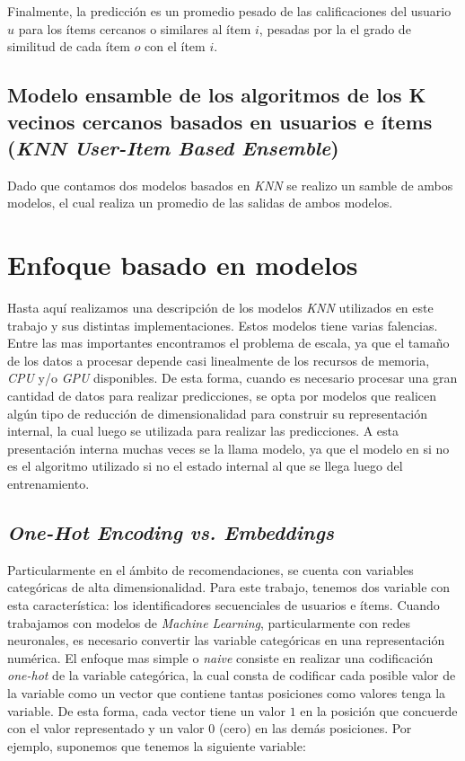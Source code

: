 \documentclass[11pt,a4paper,twoside]{thesis}
\begin{document}
Finalmente, la predicción es un promedio pesado de las calificaciones del
usuario $u$ para los ítems cercanos o similares al ítem $i$, pesadas por la el
grado de similitud de cada ítem $o$ con el ítem $i$.

\subsection{Modelo ensamble de los algoritmos de los K vecinos cercanos basados
	en usuarios e ítems (\textit{KNN User-Item Based Ensemble})}

Dado que contamos dos modelos basados en \textit{KNN} se realizo un samble de
ambos modelos, el cual realiza un promedio de las salidas de ambos modelos.

\section{Enfoque basado en modelos}

Hasta aquí realizamos una descripción de los modelos \textit{KNN} utilizados en
este trabajo y sus distintas implementaciones. Estos modelos tiene varias
falencias. Entre las mas importantes encontramos el problema de escala, ya que
el tamaño de los datos a procesar depende casi linealmente de los recursos de
memoria, \textit{CPU} y/o \textit{GPU} disponibles. De esta forma, cuando es
necesario procesar una gran cantidad de datos para realizar predicciones, se
opta por modelos que realicen algún tipo de reducción de dimensionalidad para
construir su representación internal, la cual luego se utilizada para realizar
las predicciones. A esta presentación interna muchas veces se la llama modelo,
ya que el modelo en si no es el algoritmo utilizado si no el estado internal al
que se llega luego del entrenamiento.

\subsection{\textit{One-Hot Encoding vs. Embeddings}}

Particularmente en el ámbito de recomendaciones, se cuenta con variables
categóricas de alta dimensionalidad. Para este trabajo, tenemos dos variable
con esta característica: los identificadores secuenciales de usuarios e ítems.
Cuando trabajamos con modelos de \textit{Machine Learning}, particularmente con
redes neuronales, es necesario convertir las variable categóricas en una
representación numérica. El enfoque mas simple o \textit{naive} consiste en
realizar una codificación \textit{one-hot} de la variable categórica, la cual
consta de codificar cada posible valor de la variable como un vector que
contiene tantas posiciones como valores tenga la variable. De esta forma, cada
vector tiene un valor $1$ en la posición que concuerde con el valor
representado y un valor $0$ (cero) en las demás posiciones. Por ejemplo,
suponemos que tenemos la siguiente variable:
\end{document}
